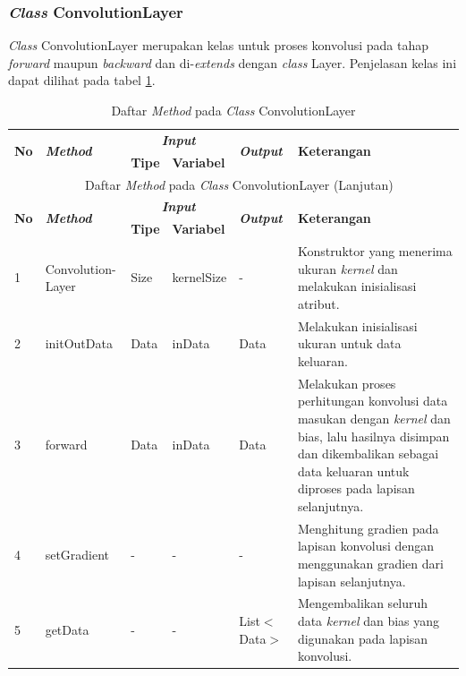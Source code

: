 \subsubsection{\textit{Class} ConvolutionLayer}
\noindent \textit{Class} ConvolutionLayer merupakan kelas untuk proses konvolusi pada tahap \textit{forward} maupun \textit{backward} dan di-\textit{extends} dengan \textit{class} Layer. Penjelasan kelas ini dapat dilihat pada tabel \ref{tbl:classConvolutionLayer}.
\begingroup
\setlength{\LTleft}{-20cm plus -1fill}
\setlength{\LTright}{\LTleft}
\begin{small}
\begin{longtable}{|p{0.4cm}|p{2cm}|p{1.8cm}|p{1.8cm}|p{1.7cm}|p{3.55cm}|}
	\caption{Daftar \textit{Method} pada \textit{Class} ConvolutionLayer \label{tbl:classConvolutionLayer}}\\
	\hline
	\multirow{2}{*}{\textbf{No}} & \multirow{2}{*}{\textit{\textbf{Method}}} & \multicolumn{2}{c|}{\textit{\textbf{Input}}} & \multirow{2}{*}{\textit{\textbf{Output}}} & 
	\multirow{2}{*}{\textbf{Keterangan}}\\
	\cline{3-4}
	& & \textbf{Tipe} & \textbf{Variabel} & & \\
	\endfirsthead
	\multicolumn{6}{c}{\textbf{\tablename~\thetable} Daftar \textit{Method} pada \textit{Class} ConvolutionLayer (Lanjutan)} \\
	\hline
	\multirow{2}{*}{\textbf{No}} & \multirow{2}{*}{\textit{\textbf{Method}}} & \multicolumn{2}{c|}{\textit{\textbf{Input}}} & \multirow{2}{*}{\textit{\textbf{Output}}} & 
	\multirow{2}{*}{\textbf{Keterangan}}\\
	\cline{3-4}
	& & \textbf{Tipe} & \textbf{Variabel} & & \\
	\endhead
	\hline
	1 & Convolution-\newline Layer & Size & kernelSize & - & Konstruktor yang menerima ukuran \textit{kernel} dan melakukan inisialisasi atribut.\\
	\hline
	2 & initOutData & Data & inData & Data & Melakukan inisialisasi ukuran untuk data keluaran.\\
	\hline
	3 & forward & Data & inData & Data & Melakukan proses perhitungan konvolusi data masukan dengan \textit{kernel} dan bias, lalu hasilnya disimpan dan dikembalikan sebagai data keluaran untuk diproses pada lapisan selanjutnya.\\
	\hline
	4 & setGradient & - & - & - & Menghitung gradien pada lapisan konvolusi dengan menggunakan gradien dari lapisan selanjutnya.\\
	\hline
	5 & getData & - & - & List$<$Data$>$ & Mengembalikan seluruh data \textit{kernel} dan bias yang digunakan pada lapisan konvolusi.\\
	\hline
\end{longtable}
\end{small}
\endgroup


